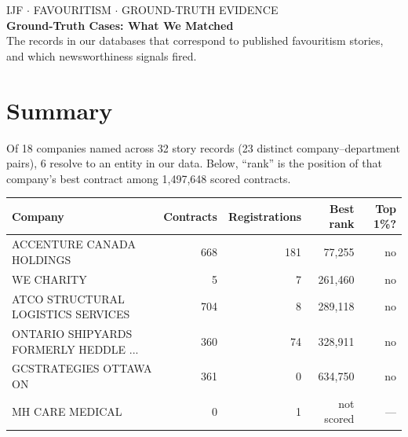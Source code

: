 \documentclass[11pt,a4paper]{article}
\begin{document}
\begin{center}
{\color{slate}\ttfamily\footnotesize IJF $\cdot$ FAVOURITISM $\cdot$ GROUND-TRUTH EVIDENCE}\\[0.5em]
{\LARGE\bfseries Ground-Truth Cases: What We Matched}\\[0.5em]
{\color{slate}\small The records in our databases that correspond to published
favouritism stories, and which newsworthiness signals fired.}
\end{center}
\vspace{0.4em}
\section*{Summary}
Of 18 companies named across 32 story records
(23 distinct company--department pairs), 6 resolve to an
entity in our data. Below, ``rank'' is the position of that company's best contract
among 1,497,648 scored contracts.\par
\begin{center}\small
\begin{tabular}{@{}lrrrr@{}}
\toprule
\textbf{Company} & \textbf{Contracts} & \textbf{Registrations} & \textbf{Best rank} & \textbf{Top 1\%?}\\
\midrule
ACCENTURE CANADA HOLDINGS & 668 & 181 & 77,255 & no\\
WE CHARITY & 5 & 7 & 261,460 & no\\
ATCO STRUCTURAL LOGISTICS SERVICES & 704 & 8 & 289,118 & no\\
ONTARIO SHIPYARDS FORMERLY HEDDLE ... & 360 & 74 & 328,911 & no\\
GCSTRATEGIES OTTAWA ON & 361 & 0 & 634,750 & no\\
MH CARE MEDICAL & 0 & 1 & not scored & ---\\
\bottomrule\end{tabular}\end{center}
\vspace{0.2em}
\noindent{}
\end{document}
